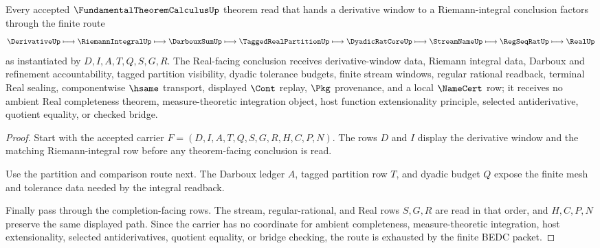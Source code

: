 \begin{theorem}
\label{thm:fundamental-theorem-calculus-riemann-derivative-route}
Every accepted $\FundamentalTheoremCalculusUp$ theorem read that hands a derivative window to a Riemann-integral conclusion factors through the finite route
$$
\DerivativeUp \longmapsto \RiemannIntegralUp \longmapsto \DarbouxSumUp \longmapsto \TaggedRealPartitionUp \longmapsto \DyadicRatCoreUp \longmapsto \StreamNameUp \longmapsto \RegSeqRatUp \longmapsto \RealUp
$$
as instantiated by $D,I,A,T,Q,S,G,R$. The Real-facing conclusion receives derivative-window data, Riemann integral data, Darboux and refinement accountability, tagged partition visibility, dyadic tolerance budgets, finite stream windows, regular rational readback, terminal Real sealing, componentwise $\hsame$ transport, displayed $\Cont$ replay, $\Pkg$ provenance, and a local $\NameCert$ row; it receives no ambient Real completeness theorem, measure-theoretic integration object, host function extensionality principle, selected antiderivative, quotient equality, or checked bridge.
\end{theorem}
\begin{proof}
Start with the accepted carrier $F=(D,I,A,T,Q,S,G,R,H,C,P,N)$. The rows $D$ and $I$ display the derivative window and the matching Riemann-integral row before any theorem-facing conclusion is read.

Use the partition and comparison route next. The Darboux ledger $A$, tagged partition row $T$, and dyadic budget $Q$ expose the finite mesh and tolerance data needed by the integral readback.

Finally pass through the completion-facing rows. The stream, regular-rational, and Real rows $S,G,R$ are read in that order, and $H,C,P,N$ preserve the same displayed path. Since the carrier has no coordinate for ambient completeness, measure-theoretic integration, host extensionality, selected antiderivatives, quotient equality, or bridge checking, the route is exhausted by the finite BEDC packet.
\end{proof}


